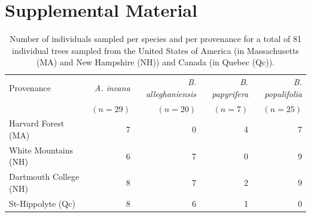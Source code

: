 \chapter{Supplemental Material}


\setlength{\tabcolsep}{3pt}

\begin{table}[ht]
\centering
\caption{Number of individuals sampled per species and per provenance for a total of 81 individual trees sampled from the United States of America (in Massachusetts (MA) and New Hampshire (NH)) and Canada (in Quebec (Qc)).} 
\label{tab:tab_species}
\begin{tabular}{lrrrr}
  \hline
Provenance & \textit{A. incana} & \textit{B. alleghaniensis} & \textit{B. papyrifera} & \textit{B. populifolia} \\
 & $(n = 29)$ & $(n = 20)$ & $(n = 7)$ & $(n = 25)$ \\
\hline
 \hline
  \hline
Harvard Forest (MA) & 7 & 0 & 4 & 7 \\ 
  White Mountains (NH) & 6 & 7 & 0 & 9 \\ 
  Dartmouth College (NH) & 8 & 7 & 2 & 9 \\ 
  St-Hippolyte (Qc) & 8 & 6 & 1 & 0 \\ 
   \hline
\end{tabular}
\end{table}


